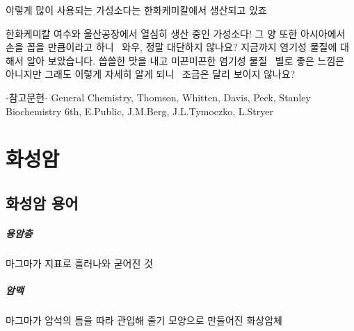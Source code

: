 \documentclass[12pt, a4paper, twoside]{book}
\begin{document}
				이렇게 많이 사용되는 가성소다는 한화케미칼에서 생산되고 있죠
				 
				한화케미칼 여수와 울산공장에서 열심히 생산 중인 가성소다! 그 양 또한 아시아에서 손을 꼽을 만큼이라고 하니~ 와우, 정말 대단하지 않나요? 지금까지 염기성 물질에 대해서 알아 보았습니다. 
				씁쓸한 맛을 내고 미끈미끈한 염기성 물질~ 별로 좋은 느낌은 아니지만 그래도 이렇게 자세히 알게 되니~ 조금은 달리 보이지 않나요? 
				 
				 
				-참고문헌-
				General Chemistry, Thomson, Whitten, Davis, Peck, Stanley
				Biochemistry 6th, E.Public, J.M.Berg, J.L.Tymoczko, L.Stryer
				 
				 
				 
				 
				
			
			
			
			
			
			
			
			
			
			
			
			
			
			
			
			


	\clearpage
	\chapter{화성암}
	\minitoc				%
	
	

	\clearpage
	\section{화성암 용어}






			\paragraph{용암층}
			마그마가 지표로 흘러나와 굳어진 것
			
			\paragraph{암맥}
			마그마가 암석의 틈을 따라 관입해 줄기 모양으로 만들어진 화상암체
			
\end{document}
